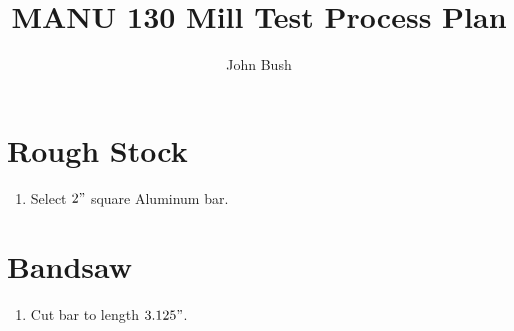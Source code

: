 \documentclass{article}
\begin{document}
\title{MANU 130 Mill Test Process Plan}
\author{John Bush}

\maketitle

\section*{Rough Stock}
\begin{enumerate}
	\item Select $2"$ square Aluminum bar.
\end{enumerate}

\section*{Bandsaw}
\begin{enumerate}[resume]
	\item Cut bar to length $3.125"$.
\end{enumerate}
\end{document}
